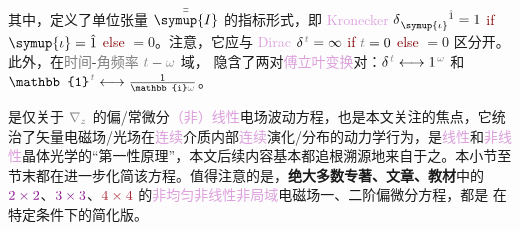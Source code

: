 其中，定义了单位张量 $\bar{\bar{\symup{I}}}$ 的指标形式，即 \textcolor{Plum}{Kronecker} $\delta^{\;\! \hphantom{\symup{\iota}} \hat{1}}_{\;\! \symup{\iota} \hphantom{z}} = 1$ \textcolor{Maroon}{if} $\symup{\iota} = \hat{1}$ \textcolor{Maroon}{else} $= 0$。注意，它应与 \textcolor{Plum}{Dirac} $\delta^{\;\! \mathcolor{gray}{t}} = \infty$ \textcolor{Maroon}{if} $\mathcolor{gray}{t} = 0$ \textcolor{Maroon}{else} $= 0$ 区分开。此外，在\textcolor{gray}{时间}-\textcolor{gray}{角频率} $\mathcolor{gray}{t} - \mathcolor{gray}{\omega}$ 域， 隐含了两对\textcolor{Plum}{傅立叶变换}对：$\delta^{\;\! \mathcolor{gray}{t}} \longleftrightarrow 1^{\;\! \mathcolor{gray}{\omega}}$ 和 $\mathbb{1}^{\;\! \mathcolor{gray}{t}} \longleftrightarrow \frac{1}{\mathbb{i} \mathcolor{gray}{\omega}}$。

 是仅关于 $\mathcolor{gray}{\nabla_z}$ 的偏/常微分\textcolor{Plum}{（非）线性}电场波动方程，也是本文关注的焦点，它统治了矢量电磁场/光场在\textcolor{Plum}{连续}介质内部\textcolor{Plum}{连续}演化/分布的动力学行为，是\textcolor{Plum}{线性}和\textcolor{Plum}{非线性}\textcolor{PineGreen}{晶体光学}的“第一性原理”，本文后续内容基本都追根溯源地来自于之。本小节至节末都在进一步化简该方程。值得注意的是，\textbf{绝大多数专著、文章、教材}中的 $\textcolor{Plum}{2 \times 2}$、$\textcolor{Plum}{3 \times 3}$、$\textcolor{Maroon}{4 \times 4}$ 的\textcolor{Plum}{非均匀}\textcolor{Plum}{非线性}\textcolor{Plum}{非局域}电磁场一、二阶偏微分方程\cite{zhangRigorousModelingLaser2015,zhangFullyVectorialSimulation2016,stallingaBerreman4x4Matrix1999,borzdovWavesLinearQuadratic1996,changWavePropagationBianisotropic2014,sturmElectromagneticWavesCrystals2024,sturmElectromagneticWavesCrystals2024,mcleodVectorFourierOptics2014,berryOpticalSingularitiesBianisotropic2005,raabMultipoleTheoryElectromagnetism2004}，都是  在特定条件下的简化版。%

